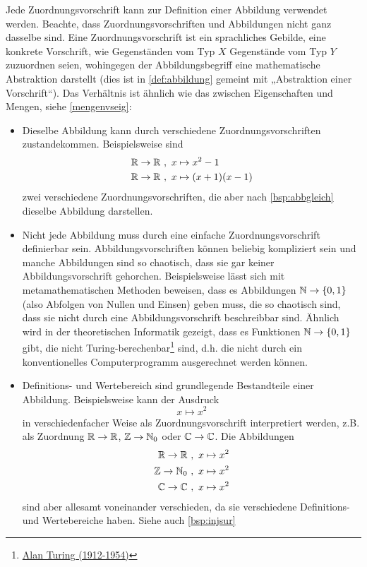 \begin{bem} \label{zuordvsabb}
    Jede Zuordnungsvorschrift kann zur Definition einer Abbildung verwendet werden. Beachte, dass Zuordnungsvorschriften und Abbildungen nicht ganz dasselbe sind. Eine Zuordnungsvorschrift ist ein sprachliches Gebilde, eine konkrete Vorschrift, wie Gegenständen vom Typ $X$ Gegenstände vom Typ $Y$ zuzuordnen seien, wohingegen der Abbildungsbegriff eine mathematische Abstraktion darstellt (dies ist in \cref{def:abbildung} gemeint mit „Abstraktion einer Vorschrift“). Das Verhältnis ist ähnlich wie das zwischen Eigenschaften und Mengen, siehe \cref{mengenvseig}:
    \begin{itemize}
        \item Dieselbe Abbildung kann durch verschiedene Zuordnungsvorschriften zustandekommen. Beispielsweise sind
        \begin{align*}
            \mathbb R \to \mathbb R \ &,\ x\mapsto x^2-1 \\
            \mathbb R \to \mathbb R \ &,\ x\mapsto (x+1)(x-1)
        \end{align*}
        zwei verschiedene Zuordnungsvorschriften, die aber nach \cref{bsp:abbgleich} dieselbe Abbildung darstellen.
        \item Nicht jede Abbildung muss durch eine einfache Zuordnungsvorschrift definierbar sein. Abbildungsvorschriften können beliebig kompliziert sein und manche Abbildungen sind so chaotisch, dass sie gar keiner Abbildungsvorschrift gehorchen. Beispielsweise lässt sich mit metamathematischen Methoden beweisen, dass es Abbildungen $\mathbb N \to \{0,1\}$ (also Abfolgen von Nullen und Einsen) geben muss, die so chaotisch sind, dass sie nicht durch eine Abbildungsvorschrift beschreibbar sind. Ähnlich wird in der theoretischen Informatik gezeigt, dass es Funktionen $\mathbb N\to \{0,1\}$ gibt, die nicht Turing-berechenbar\footnote{\href{https://de.wikipedia.org/wiki/Alan_Turing}{Alan Turing (1912-1954)}} sind, d.h. die nicht durch ein konventionelles Computerprogramm ausgerechnet werden können.
        \item Definitions- und Wertebereich sind grundlegende Bestandteile einer Abbildung. Beispielsweise kann der Ausdruck
            \[ x\mapsto x^2 \]
        in verschiedenfacher Weise als Zuordnungsvorschrift interpretiert werden, z.B. als Zuordnung $\mathbb R\to \mathbb R$, $\mathbb Z\to \mathbb N_0$ oder $\mathbb C\to \mathbb C$. Die Abbildungen
        \begin{align*}
            \mathbb R \to \mathbb R \ & ,\ x\mapsto x^2 \\
            \mathbb Z \to \mathbb N_0 \ & ,\ x\mapsto x^2 \\
            \mathbb C \to \mathbb C \ &,\ x\mapsto x^2 
        \end{align*}
        sind aber allesamt voneinander verschieden, da sie verschiedene Definitions- und Wertebereiche haben. Siehe auch \cref{bsp:injsur}
    \end{itemize}
\end{bem}


